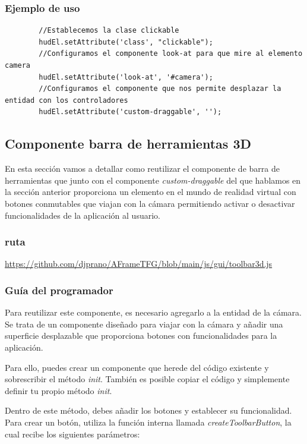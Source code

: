 \documentclass[a4paper, 11pt]{book}
\begin{document}
\subsubsection{Ejemplo de uso}
{\scriptsize
	\begin{verbatim}
		//Establecemos la clase clickable
		hudEl.setAttribute('class', "clickable");
		//Configuramos el componente look-at para que mire al elemento camera
		hudEl.setAttribute('look-at', '#camera');
		//Configuramos el componente que nos permite desplazar la entidad con los controladores
		hudEl.setAttribute('custom-draggable', '');
	\end{verbatim}
}
\subsection{Componente barra de herramientas 3D}
En esta sección vamos a detallar como reutilizar el componente de barra de herramientas que junto con el componente \emph{custom-draggable} del que hablamos en la sección anterior proporciona un elemento en el mundo de realidad virtual con botones conmutables que viajan con la cámara permitiendo activar o desactivar funcionalidades de la aplicación al usuario.
\subsubsection{ruta}
{\scriptsize
	\url{https://github.com/djprano/AFrameTFG/blob/main/js/gui/toolbar3d.js}
}
\subsubsection{Guía del programador}
Para reutilizar este componente, es necesario agregarlo a la entidad de la cámara. Se trata de un componente diseñado para viajar con la cámara y añadir una superficie desplazable que proporciona botones con funcionalidades para la aplicación.

Para ello, puedes crear un componente que herede del código existente y sobrescribir el método \emph{init}. También es posible copiar el código y simplemente definir tu propio método \emph{init}.

Dentro de este método, debes añadir los botones y establecer su funcionalidad. Para crear un botón, utiliza la función interna llamada \emph{createToolbarButton}, la cual recibe los siguientes parámetros:
\end{document}

